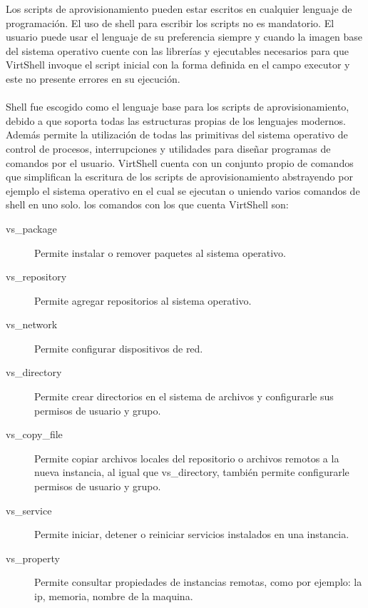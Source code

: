 \vspace{5mm}

Los scripts de aprovisionamiento pueden estar escritos en cualquier lenguaje de programación. El uso de shell para escribir los scripts no es mandatorio. El usuario puede usar el lenguaje de su preferencia siempre y cuando la imagen base del sistema operativo cuente con las librerías y ejecutables necesarios para que VirtShell invoque el script inicial con la forma definida en el campo executor y este no presente errores en su ejecución.\\
\\
Shell fue escogido como el lenguaje base para los scripts de aprovisionamiento, debido a que soporta todas las estructuras propias de los lenguajes modernos. Además permite la utilización de todas las primitivas del sistema operativo de control de procesos, interrupciones y utilidades para diseñar programas de comandos por el usuario. VirtShell cuenta con un conjunto propio de comandos que simplifican la escritura de los scripts de aprovisionamiento abstrayendo por ejemplo el sistema operativo en el cual se ejecutan o uniendo varios comandos de shell en uno solo. los comandos con los que cuenta VirtShell son:

\vspace{3mm}

\begin{description}
\item [vs\_package] Permite instalar o remover paquetes al sistema operativo.
\item [vs\_repository] Permite agregar repositorios al sistema operativo.
\item [vs\_network] Permite configurar dispositivos de red.
\item [vs\_directory] Permite crear directorios en el sistema de archivos y configurarle sus permisos de usuario y grupo.
\item [vs\_copy\_file] Permite copiar archivos locales del repositorio o archivos remotos a la nueva instancia, al igual que vs\_directory, también permite configurarle permisos de usuario y grupo.
\item [vs\_service] Permite iniciar, detener o reiniciar servicios instalados en una instancia.
\item [vs\_property] Permite consultar propiedades de instancias remotas, como por ejemplo: la ip, memoria, nombre de la maquina. 
\end{description}

\vspace{3mm}

